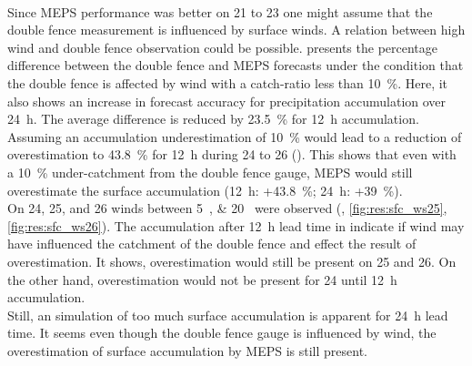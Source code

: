 \\
Since MEPS performance was better on \num{21} to \SI{23}{\dec} one might assume that the double fence measurement is influenced by surface winds. 
A relation between high wind and double fence observation could be possible.  presents the percentage difference between the double fence and MEPS forecasts under the condition that the double fence is affected by wind with a catch-ratio less than \SI{10}{\percent}. Here, it also shows an increase in forecast accuracy for precipitation accumulation over \SI{24}{\hour}.
The average difference is reduced by \SI{23.5}{\percent} for \SI{12}{\hour} accumulation. Assuming an accumulation underestimation of \SI{10}{\percent} would lead to a reduction of overestimation to \SI{43.8}{\percent} for \SI{12}{\hour} during \num{24} to \SI{26}{\dec} ().
This shows that even with a \SI{10}{\percent} under-catchment from the double fence gauge, MEPS would still overestimate the surface accumulation (\SI{12}{\hour}: +\SI{43.8}{\percent}; \SI{24}{\hour}: +\SI{39}{\percent}). 
\\
On \num{24}, \num{25}, and \SI{26}{\dec} winds between \SIlist{5;20}{\mPs} were observed (, \ref{fig:res:sfc_ws25}, \ref{fig:res:sfc_ws26}). The accumulation after \SI{12}{\hour} lead time in  indicate if wind may have influenced the catchment of the double fence and effect the result of overestimation. It shows, overestimation would still be present on \num{25} and \SI{26}{\dec}. On the other hand, overestimation would not be present for \SI{24}{\dec} until \SI{12}{\hour} accumulation.
\\
Still, an simulation of too much surface accumulation is apparent for \SI{24}{\hour} lead time.
It seems even though the double fence gauge is influenced by wind, the overestimation of surface accumulation by MEPS is still present. 
